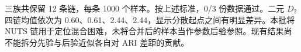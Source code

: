 三族共保留 12 条链，每条 1000 个样本。按上述标准，0/3 份数据通过。二元 $D_2$ 四链均值依次为 0.60、0.61、2.44、2.44，显示分散起点之间有明显差异。本批将 NUTS 链用于定位混合困难，未将合并后的样本当作参数后验参照。现有结果尚不能拆分先验与后验近似各自对 ARI 差距的贡献。

